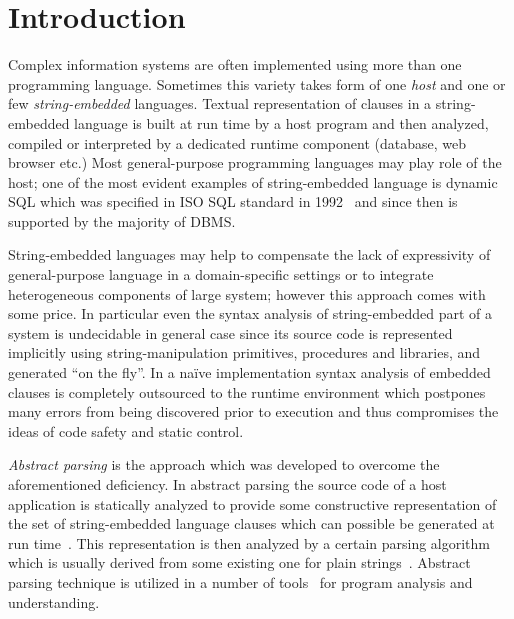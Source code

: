 \section{Introduction}

Complex information systems are often implemented using more than one programming language. 
Sometimes this variety takes form of one \emph{host} and one or few \emph{string-embedded}
languages. Textual representation of clauses in a string-embedded language is built at 
run time by a host program and then analyzed, compiled or interpreted by a dedicated 
runtime component (database, web browser etc.) Most general-purpose programming languages 
may play role of the host; one of the most evident examples of string-embedded language is 
dynamic SQL which was specified in ISO SQL standard in 1992~\cite{ISO} and since then is 
supported by the majority of DBMS. 



String-embedded languages may help to compensate the lack of expressivity of general-purpose
language in a domain-specific settings or to integrate heterogeneous components of large system;
however this approach comes with some price. In particular even the syntax analysis of 
string-embedded part of a system is undecidable in general case since its source code
is represented implicitly using string-manipulation primitives, procedures and libraries, and
generated ``on the fly''. In a na\"ive implementation syntax analysis of embedded clauses is
completely outsourced to the runtime environment which postpones many errors from being 
discovered prior to execution and thus compromises the ideas of code safety and static control.

\emph{Abstract parsing} is the approach which was developed to overcome the 
aforementioned deficiency. In abstract parsing the source code of a host application is statically 
analyzed to provide some constructive representation of the set of string-embedded language clauses which
can possible be generated at run time~\cite{AbstrParsing,StringExpr}. This representation is then analyzed 
by a certain parsing algorithm which is usually derived from some existing one for plain strings~\cite{Grune}.
Abstract parsing technique is utilized in a number of tools~\cite{JSA,PHPSA,ALVOR1,ALVOR2} for
program analysis and understanding.


